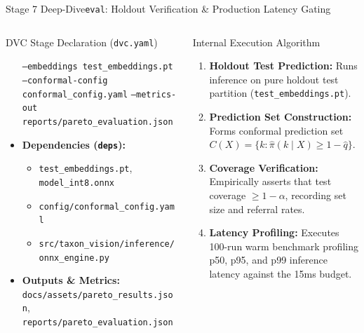 \begin{frame}{Stage 7 Deep-Dive}{\texttt{eval}: Holdout Verification \& Production Latency Gating}
\begin{columns}[T]
\begin{column}{0.48\textwidth}
\begin{block}{DVC Stage Declaration (\texttt{dvc.yaml})}
\begin{itemize}
                        \texttt{--embeddings test\_embeddings.pt} \newline
                        \texttt{--conformal-config conformal\_config.yaml} \newline
                        \texttt{--metrics-out reports/pareto\_evaluation.json}
                    \item \textbf{Dependencies (\texttt{deps}):}
                        \begin{itemize}\tiny
                            \item \texttt{test\_embeddings.pt}, \texttt{model\_int8.onnx}
                            \item \texttt{config/conformal\_config.yaml}
                            \item \texttt{src/taxon\_vision/inference/onnx\_engine.py}
                        \end{itemize}
                    \item \textbf{Outputs \& Metrics:}
                        \texttt{docs/assets/pareto\_results.json}, \newline
                        \texttt{reports/pareto\_evaluation.json}
                \end{itemize}
            \end{block}
        \end{column}
        \begin{column}{0.48\textwidth}
            \begin{block}{Internal Execution Algorithm}
                \begin{enumerate}\scriptsize
                    \item \textbf{Holdout Test Prediction:} Runs inference on pure holdout test partition (\texttt{test\_embeddings.pt}).
                    \item \textbf{Prediction Set Construction:} Forms conformal prediction set $C(X) = \{k : \hat{\pi}(k \mid X) \ge 1 - \hat{q}\}$.
                    \item \textbf{Coverage Verification:} Empirically asserts that test coverage $\ge 1 - \alpha$, recording set size and referral rates.
                    \item \textbf{Latency Profiling:} Executes 100-run warm benchmark profiling p50, p95, and p99 inference latency against the 15ms budget.
                \end{enumerate}
            \end{block}
        \end{column}
    \end{columns}



\end{frame}
